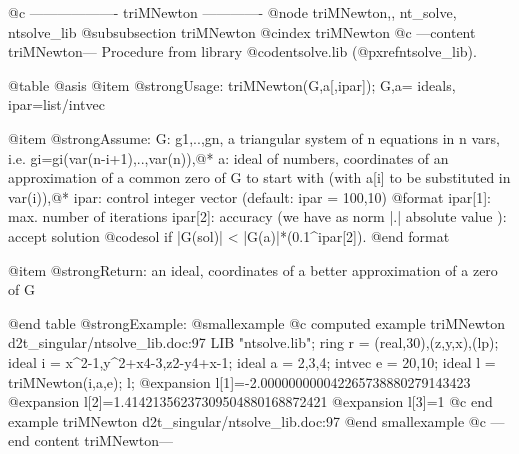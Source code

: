 @c ------------------- triMNewton -------------
@node triMNewton,, nt_solve, ntsolve_lib
@subsubsection triMNewton
@cindex triMNewton
@c ---content triMNewton---
Procedure from library @code{ntsolve.lib} (@pxref{ntsolve_lib}).

@table @asis
@item @strong{Usage:}
triMNewton(G,a[,ipar]); G,a= ideals, ipar=list/intvec

@item @strong{Assume:}
G: g1,..,gn, a triangular system of n equations in n vars, i.e.
gi=gi(var(n-i+1),..,var(n)),@*
a: ideal of numbers, coordinates of an approximation of a common
zero of G to start with (with a[i] to be substituted in var(i)),@*
ipar: control integer vector (default: ipar = 100,10)
  @format
  ipar[1]: max. number of iterations
  ipar[2]: accuracy (we have as norm |.| absolute value ):
           accept solution @code{sol} if |G(sol)| < |G(a)|*(0.1^ipar[2]).
  @end format

@item @strong{Return:}
an ideal, coordinates of a better approximation of a zero of G

@end table
@strong{Example:}
@smallexample
@c computed example triMNewton d2t_singular/ntsolve_lib.doc:97 
LIB "ntsolve.lib";
ring r = (real,30),(z,y,x),(lp);
ideal i = x^2-1,y^2+x4-3,z2-y4+x-1;
ideal a = 2,3,4;
intvec e = 20,10;
ideal l = triMNewton(i,a,e);
l;
@expansion{} l[1]=-2.000000000042265738880279143423
@expansion{} l[2]=1.41421356237309504880168872421
@expansion{} l[3]=1
@c end example triMNewton d2t_singular/ntsolve_lib.doc:97
@end smallexample
@c ---end content triMNewton---
